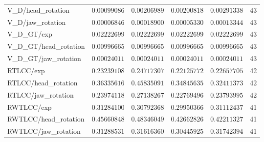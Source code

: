 \begin{table}[t]
\begin{tabular}{lrrrrr}
V\_D/head\_rotation & $0.00099086$ & $0.00206989$ & $0.00200818$ & $0.00291338$ & 43 \\
V\_D/jaw\_rotation & $0.00006846$ & $0.00018900$ & $0.00005330$ & $0.00013344$ & 43 \\
V\_D\_GT/exp & $0.02222699$ & $0.02222699$ & $0.02222699$ & $0.02222699$ & 43 \\
V\_D\_GT/head\_rotation & $0.00996665$ & $0.00996665$ & $0.00996665$ & $0.00996665$ & 43 \\
V\_D\_GT/jaw\_rotation & $0.00024011$ & $0.00024011$ & $0.00024011$ & $0.00024011$ & 43 \\
RTLCC/exp & $0.23239108$ & $0.24717307$ & $0.22125772$ & $0.22657705$ & 42 \\
RTLCC/head\_rotation & $0.36335616$ & $0.45835091$ & $0.34845635$ & $0.32411373$ & 42 \\
RTLCC/jaw\_rotation & $0.23974118$ & $0.27138267$ & $0.22769496$ & $0.23793995$ & 42 \\
RWTLCC/exp & $0.31284100$ & $0.30792368$ & $0.29950366$ & $0.31112437$ & 41 \\
RWTLCC/head\_rotation & $0.45660848$ & $0.48346049$ & $0.42662826$ & $0.42211327$ & 41 \\
RWTLCC/jaw\_rotation & $0.31288531$ & $0.31616360$ & $0.30445925$ & $0.31742394$ & 41 \\
\bottomrule
\end{tabular}
\end{table}
